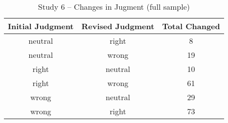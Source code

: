 \documentclass[
  american,
  man,floatsintext]{apa7}
\begin{document}
\begin{table}[tbp]

\begin{center}
\begin{threeparttable}

\caption{\label{tab:tabS6change}Study 6 – Changes in Jugment (full sample)}

\begin{tabular}{ccc}
\toprule
Initial Judgment & \multicolumn{1}{c}{Revised Judgment} & \multicolumn{1}{c}{Total Changed}\\
\midrule
neutral & right & 8\\
neutral & wrong & 19\\
right & neutral & 10\\
right & wrong & 61\\
wrong & neutral & 29\\
wrong & right & 73\\
\bottomrule
\end{tabular}

\end{threeparttable}
\end{center}

\end{table}
\end{document}
